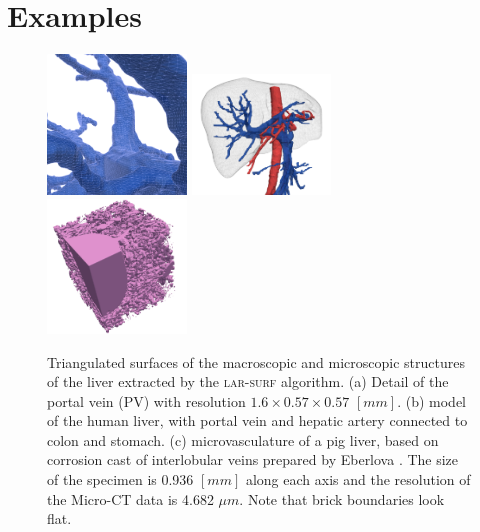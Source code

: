 
\section{Examples}\label{sec:examples}


\begin{figure}[tbp]
\includegraphics[height=0.3\textwidth,width=0.33\textwidth]{figs/image-1.png}%
\includegraphics[height=0.3\textwidth,width=0.33\textwidth]{figs/image-2.png}%
\includegraphics[height=0.3\textwidth,width=0.33\textwidth]{figs/image-3.png}%
\caption{\small Triangulated surfaces of the macroscopic and microscopic structures of the liver extracted by the \textsc{lar-surf} algorithm. 
(a) Detail of the portal vein (PV) with resolution $1.6\times0.57\times0.57$ $[mm]$.
(b) model of the human liver, with portal vein and hepatic artery connected to colon and stomach.
(c) microvasculature of a pig liver, based on corrosion cast of interlobular veins prepared by Eberlova
\cite{eberlova2017use}. The size of the specimen is 0.936 $[mm]$ along each axis and the resolution of the Micro-CT data is 4.682 $\mu{}m$. Note that brick boundaries look flat.
}
\label{fig:example_liver_macro_micro}
\end{figure}

